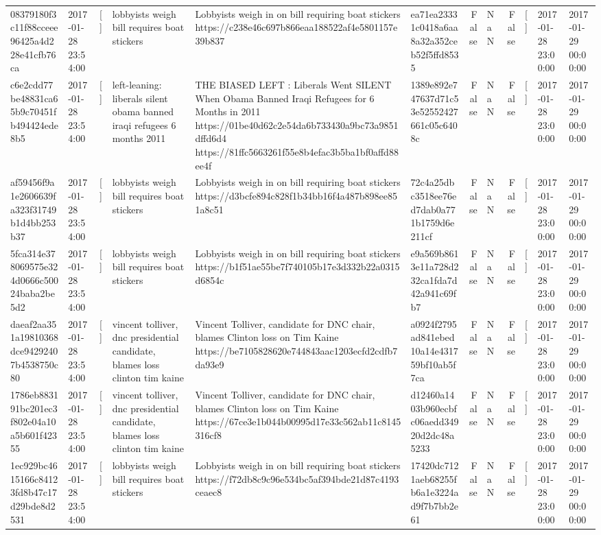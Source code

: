 \begin{tabular}{llllllrlrlll}
08379180f3c11f88cceee96425a4d228e41cfb76ca & 2017-01-28 23:54:00 & [] & lobbyists weigh bill requires boat stickers & Lobbyists weigh in on bill requiring boat stickers https://c238e46c697b866eaa188522af4e5801157e39b837 & ea71ea23331c0418a6aa8a32a352ceb52f5ffd8535 & False & NaN & False & [] & 2017-01-28 23:00:00 & 2017-01-29 00:00:00 \\
c6e2cdd77be48831ca65b9c70451fb494424ede8b5 & 2017-01-28 23:54:00 & [] & left-leaning: liberals silent obama banned iraqi refugees 6 months 2011 & THE BIASED LEFT : Liberals Went SILENT When Obama Banned Iraqi Refugees for 6 Months in 2011 https://01be40d62c2e54da6b733430a9bc73a9851dffd6d4 https://81ffc5663261f55e8b4efac3b5ba1bf0affd88ee4f & 1389e892e747637d71c53e52552427661c05c6408c & False & NaN & False & [] & 2017-01-28 23:00:00 & 2017-01-29 00:00:00 \\
af59456f9a1e2606639fa323f31749b1d4bb253b37 & 2017-01-28 23:54:00 & [] & lobbyists weigh bill requires boat stickers & Lobbyists weigh in on bill requiring boat stickers https://d3bcfe894c828f1b34bb16f4a487b898ee851a8c51 & 72c4a25dbc3518ee76ed7dab0a771b1759d6e211cf & False & NaN & False & [] & 2017-01-28 23:00:00 & 2017-01-29 00:00:00 \\
5fca314e378069575e324d0666c50024baba2be5d2 & 2017-01-28 23:54:00 & [] & lobbyists weigh bill requires boat stickers & Lobbyists weigh in on bill requiring boat stickers https://b1f51ae55be7f740105b17e3d332b22a0315d6854c & e9a569b8613e11a728d232ca1fda7d42a941c69fb7 & False & NaN & False & [] & 2017-01-28 23:00:00 & 2017-01-29 00:00:00 \\
daeaf2aa351a19810368dce94292407b4538750c80 & 2017-01-28 23:54:00 & [] & vincent tolliver, dnc presidential candidate, blames loss clinton tim kaine & Vincent Tolliver, candidate for DNC chair, blames Clinton loss on Tim Kaine https://be7105828620e744843aac1203ecfd2cdfb7da93e9 & a0924f2795ad841ebed10a14e431759bf10ab5f7ca & False & NaN & False & [] & 2017-01-28 23:00:00 & 2017-01-29 00:00:00 \\
1786eb883191bc201ec3f802e04a10a5b601f42355 & 2017-01-28 23:54:00 & [] & vincent tolliver, dnc presidential candidate, blames loss clinton tim kaine & Vincent Tolliver, candidate for DNC chair, blames Clinton loss on Tim Kaine https://67ce3e1b044b00995d17e33c562ab11c8145316cf8 & d12460a1403b960ecbfc06aedd34920d2dc48a5233 & False & NaN & False & [] & 2017-01-28 23:00:00 & 2017-01-29 00:00:00 \\
1ec929bc4615166c84123fd8b47c17d29bde8d2531 & 2017-01-28 23:54:00 & [] & lobbyists weigh bill requires boat stickers & Lobbyists weigh in on bill requiring boat stickers https://f72db8c9c96e534bc5af394bde21d87c4193ceaec8 & 17420dc7121aeb68255fb6a1e3224ad9f7b7bb2e61 & False & NaN & False & [] & 2017-01-28 23:00:00 & 2017-01-29 00:00:00 \\

\end{tabular}
